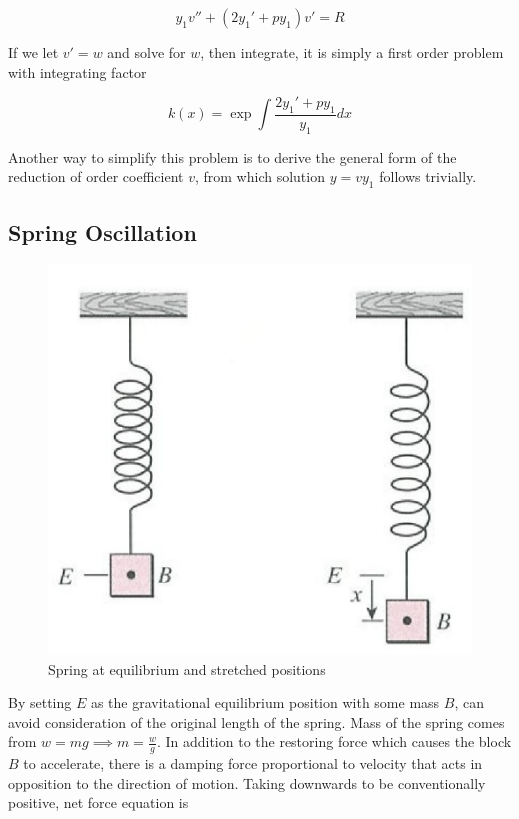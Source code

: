 \begin{equation}
    y_1v''+(2y_1'+py_1)v'=R
\end{equation}

If we let $v'=w$ and solve for $w$, then integrate, it is simply a first order problem with integrating factor

\begin{equation}
    k(x)=\exp{\int \frac{2y_1'+py_1}{y_1} dx}
\end{equation}

Another way to simplify this problem is to derive the general form of the reduction of order coefficient $v$,
from which solution $y=vy_1$ follows trivially.

\subsection{Spring Oscillation}

\begin{figure}[H]
    \centering
    \includegraphics[scale=0.8]{figures/Screen Shot 2021-12-05 at 5.16.10 PM.png}
    \caption{Spring at equilibrium and stretched positions}
\end{figure}

By setting $E$ as the gravitational equilibrium position with some mass $B$, can avoid consideration of the original length of the spring.
Mass of the spring comes from $w=mg\implies m = \frac{w}{g}$. In addition to the restoring force which causes the block $B$ to accelerate, there is a
damping force proportional to velocity that acts in opposition to the direction of motion. Taking downwards to be conventionally positive, net force equation is

